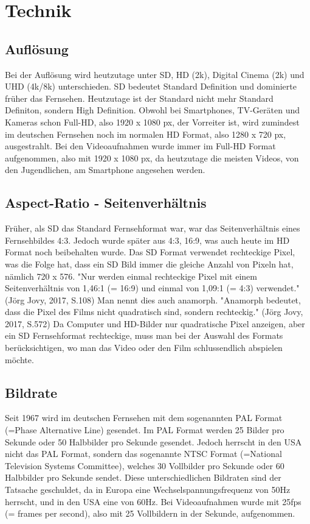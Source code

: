\section{Technik}
\subsection{Auflösung}
Bei der Auflösung wird heutzutage unter SD, HD (2k), Digital Cinema (2k) und UHD (4k/8k) unterschieden. SD bedeutet Standard Definition und dominierte früher das Fernsehen. Heutzutage ist der Standard nicht mehr Standard Definiton, sondern High Definition. Obwohl bei Smartphones, TV-Geräten und Kameras schon Full-HD, also 1920 x 1080 px, der Vorreiter ist, wird zumindest im deutschen Fernsehen noch im normalen HD Format, also 1280 x 720 px, ausgestrahlt.\citep{joerg}\newline
Bei den Videoaufnahmen wurde immer im Full-HD Format aufgenommen, also mit 1920 x 1080 px, da heutzutage die meisten Videos, von den Jugendlichen, am Smartphone angesehen werden.
\subsection{Aspect-Ratio - Seitenverhältnis}
Früher, als SD das Standard Fernsehformat war, war das Seitenverhältnis eines Fernsehbildes 4:3. Jedoch wurde später aus 4:3, 16:9, was auch heute im HD Format noch beibehalten wurde. Das SD Format verwendet rechteckige Pixel, was die Folge hat, dass ein SD Bild immer die gleiche Anzahl von Pixeln hat, nämlich 720 x 576. "Nur werden einmal rechteckige Pixel mit einem Seitenverhältnis von 1,46:1 (= 16:9) und einmal von 1,09:1 (= 4:3) verwendet." (Jörg Jovy, 2017, S.108)\newline 
Man nennt dies auch anamorph. "Anamorph bedeutet, dass die Pixel des Films nicht quadratisch sind, sondern rechteckig." (Jörg Jovy, 2017, S.572)\newline
Da Computer und HD-Bilder nur quadratische Pixel anzeigen, aber ein SD Fernsehformat rechteckige, muss man bei der Auswahl des Formats berücksichtigen, wo man das Video oder den Film schlussendlich abspielen möchte.\citep{aspect}
\subsection{Bildrate}
Seit 1967 wird im deutschen Fernsehen mit dem sogenannten PAL Format (=Phase Alternative Line) gesendet. Im PAL Format werden 25 Bilder pro Sekunde oder 50 Halbbilder pro Sekunde gesendet. Jedoch herrscht in den USA nicht das PAL Format, sondern das sogenannte NTSC Format (=National Television Systems Committee), welches 30 Vollbilder pro Sekunde oder 60 Halbbilder pro Sekunde sendet. Diese unterschiedlichen Bildraten sind der Tatsache geschuldet, da in Europa eine Wechselspannungsfrequenz von 50Hz herrscht, und in den USA eine von 60Hz.\citep{bildrate}\newline
Bei Videoaufnahmen wurde mit 25fps (= frames per second), also mit 25 Vollbildern in der Sekunde, aufgenommen.
